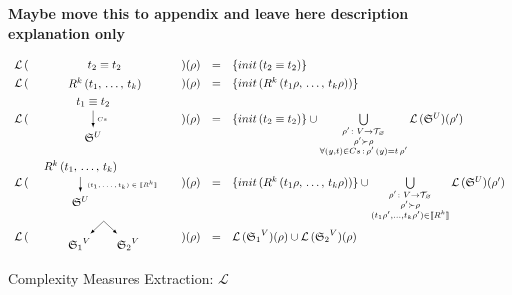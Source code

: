 \begin{figure}[t]
\colorbox{yellow!20}{\parbox{\textwidth}{\textbf{Maybe move this to appendix and leave here description explanation only}}}

\[
\begin{array}{rclcl}
 \mathcal{L}\,(&\parbox[m]{1.3cm}{\schemenode{$\unigoal{t_2}{t_2}$}}&)(\rho) &=& \{init\,(\unigoal{t_2}{t_2})\} \\

 \mathcal{L}\,(&\parbox[m]{2.5cm}{\schemenode{$\invokegoal{R^k}{t_1}{t_k}$}}&)(\rho) &=& \{init\,(\invokegoal{R^k}{t_1 \rho}{t_k \rho})\} \\

 \mathcal{L}\,(&\parbox[m]{2cm}{\schemesarrow{$\unigoal{t_1}{t_2}$}{$Cs$}{$\schemewithvset{\mathfrak{S}}{U}$}} &)(\rho) &=&  \{init\,(\unigoal{t_2}{t_2})\} \cup
      \bigcup\limits_{\substack{ \rho' \colon V \to \grterms \\
                                      \rho' \succ \rho \\
                                      \forall (y, t) \in Cs\,:\, \rho'\,(y) = t\, \rho'  }}
           \mathcal{L}\,(\schemewithvset{\mathfrak{S}}{U})(\rho')  \\

 \mathcal{L}\,(& \parbox[m]{4cm}{\schemedarrow{$\invokegoal{R^k}{t_1}{t_k}$}{ $(t_1, \dots, t_k) \in \sembr{R^k}  $}{$\schemewithvset{\mathfrak{S}}{U}$}} &)(\rho) &=&
      \{init\,(\invokegoal{R^k}{t_1 \rho}{t_k \rho})\} \cup
      \bigcup\limits_{\substack{ \rho' \colon V \to \grterms \\
                                      \rho' \succ \rho \\
                                      (t_1 \rho', \dots, t_k \rho') \in \sembr{R^k}  }}
           \mathcal{L}\,(\schemewithvset{\mathfrak{S}}{U})(\rho')  \\

 \mathcal{L}\,(&\parbox[m]{2.5cm}{\schemefork{$\schemewithvset{\mathfrak{S}_1}{V}$}{$\schemewithvset{\mathfrak{S}_2}{V}$}}&)(\rho) &=&
 \mathcal{L}\,(\schemewithvset{\mathfrak{S}_1}{V})(\rho) \cup \mathcal{L}\,(\schemewithvset{\mathfrak{S}_2}{V})(\rho)
\end{array}
\]
\caption{Complexity Measures Extraction: $\mathcal L$}
\label{fig:scheduling_extraction_l}
\end{figure}

